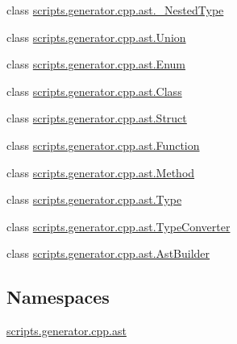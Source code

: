 \begin{DoxyCompactItemize}
\item 
class \mbox{\hyperlink{classscripts_1_1generator_1_1cpp_1_1ast_1_1___nested_type}{scripts.\+generator.\+cpp.\+ast.\+\_\+\+Nested\+Type}}
\item 
class \mbox{\hyperlink{classscripts_1_1generator_1_1cpp_1_1ast_1_1_union}{scripts.\+generator.\+cpp.\+ast.\+Union}}
\item 
class \mbox{\hyperlink{classscripts_1_1generator_1_1cpp_1_1ast_1_1_enum}{scripts.\+generator.\+cpp.\+ast.\+Enum}}
\item 
class \mbox{\hyperlink{classscripts_1_1generator_1_1cpp_1_1ast_1_1_class}{scripts.\+generator.\+cpp.\+ast.\+Class}}
\item 
class \mbox{\hyperlink{classscripts_1_1generator_1_1cpp_1_1ast_1_1_struct}{scripts.\+generator.\+cpp.\+ast.\+Struct}}
\item 
class \mbox{\hyperlink{classscripts_1_1generator_1_1cpp_1_1ast_1_1_function}{scripts.\+generator.\+cpp.\+ast.\+Function}}
\item 
class \mbox{\hyperlink{classscripts_1_1generator_1_1cpp_1_1ast_1_1_method}{scripts.\+generator.\+cpp.\+ast.\+Method}}
\item 
class \mbox{\hyperlink{classscripts_1_1generator_1_1cpp_1_1ast_1_1_type}{scripts.\+generator.\+cpp.\+ast.\+Type}}
\item 
class \mbox{\hyperlink{classscripts_1_1generator_1_1cpp_1_1ast_1_1_type_converter}{scripts.\+generator.\+cpp.\+ast.\+Type\+Converter}}
\item 
class \mbox{\hyperlink{classscripts_1_1generator_1_1cpp_1_1ast_1_1_ast_builder}{scripts.\+generator.\+cpp.\+ast.\+Ast\+Builder}}
\end{DoxyCompactItemize}
\subsection*{Namespaces}
\begin{DoxyCompactItemize}
\item 
 \mbox{\hyperlink{namespacescripts_1_1generator_1_1cpp_1_1ast}{scripts.\+generator.\+cpp.\+ast}}
\end{DoxyCompactItemize}
